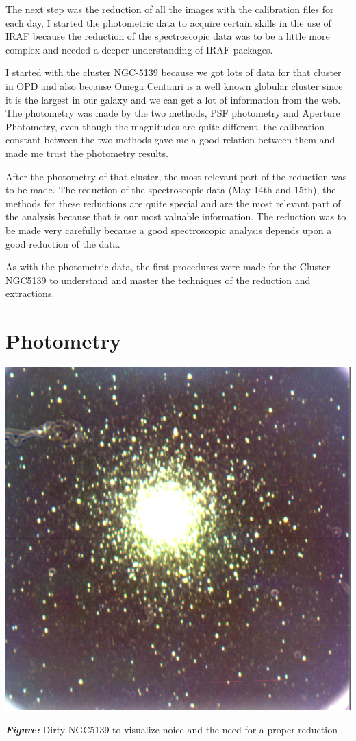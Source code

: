The next step was the reduction of all the images with the calibration files for each day, I started the photometric data to acquire certain skills in the use of IRAF because the reduction of the spectroscopic data was to be a little more complex and needed a deeper understanding of IRAF packages. 

I started with the cluster NGC-5139 because we got lots of data for that cluster in OPD and also because Omega Centauri is a well known globular cluster since it is the largest in our galaxy and we can get a lot of information from the web. The photometry was made by the two methods, PSF photometry and Aperture Photometry, even though the magnitudes are quite different, the calibration constant between the two methods gave me a good relation between them and made me trust the photometry results.

After the photometry of that cluster, the most relevant part of the reduction was to be made. The reduction of the spectroscopic data (May 14th and 15th), the methods for these reductions are quite special and are the most relevant part of the analysis because that is our most valuable information. The reduction was to be made very carefully because a good spectroscopic analysis depends upon a good reduction of the data. 

As with the photometric data, the first procedures were made for the Cluster NGC5139 to understand and master the techniques of the reduction and extractions.

\section{Photometry}

\begin{center}
\includegraphics[scale=0.5]{ngc_5139_dirty.png}

\textit{\textbf{Figure:}} Dirty NGC5139 to visualize noice and the need for a proper reduction
\end{center}

